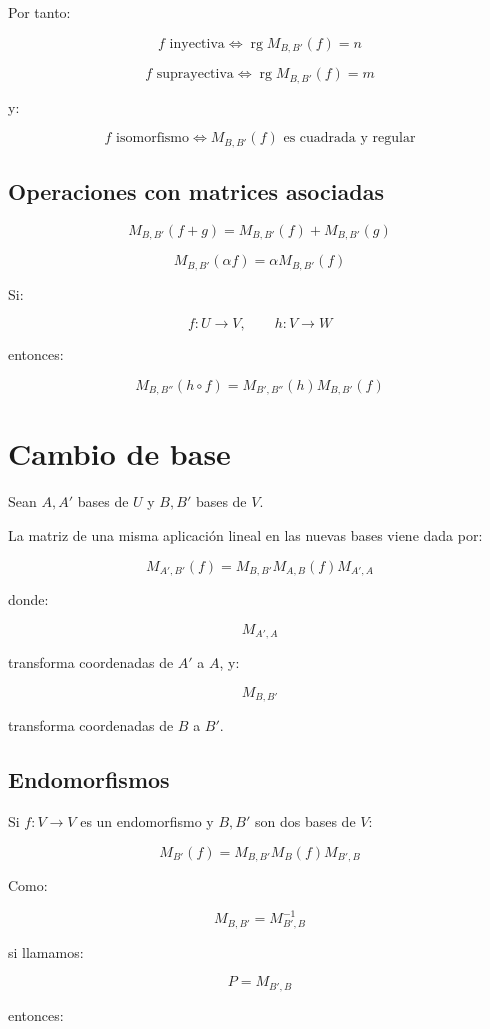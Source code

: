 \documentclass[11pt,a4paper]{article}
\newcommand{\rg}{\operatorname{rg}}
\begin{document}
Por tanto:

\[
f\text{ inyectiva}
\iff
\rg M_{B,B'}(f)=n
\]

\[
f\text{ suprayectiva}
\iff
\rg M_{B,B'}(f)=m
\]

y:

\[
f\text{ isomorfismo}
\iff
M_{B,B'}(f)
\text{ es cuadrada y regular}
\]

\subsection{Operaciones con matrices asociadas}

\[
M_{B,B'}(f+g)
=
M_{B,B'}(f)+M_{B,B'}(g)
\]

\[
M_{B,B'}(\alpha f)
=
\alpha M_{B,B'}(f)
\]

Si:

\[
f:U\to V,
\qquad
h:V\to W
\]

entonces:

\[
\boxed{
M_{B,B''}(h\circ f)
=
M_{B',B''}(h)
M_{B,B'}(f)
}
\]

\section{Cambio de base}

Sean $A,A'$ bases de $U$ y $B,B'$ bases de $V$.

La matriz de una misma aplicación lineal en las nuevas bases viene dada por:

\[
\boxed{
M_{A',B'}(f)
=
M_{B,B'}
M_{A,B}(f)
M_{A',A}
}
\]

donde:

\[
M_{A',A}
\]

transforma coordenadas de $A'$ a $A$, y:

\[
M_{B,B'}
\]

transforma coordenadas de $B$ a $B'$.

\subsection{Endomorfismos}

Si $f:V\to V$ es un endomorfismo y $B,B'$ son dos bases de $V$:

\[
M_{B'}(f)
=
M_{B,B'}M_B(f)M_{B',B}
\]

Como:

\[
M_{B,B'}=M_{B',B}^{-1}
\]

si llamamos:

\[
P=M_{B',B}
\]

entonces:
\end{document}
